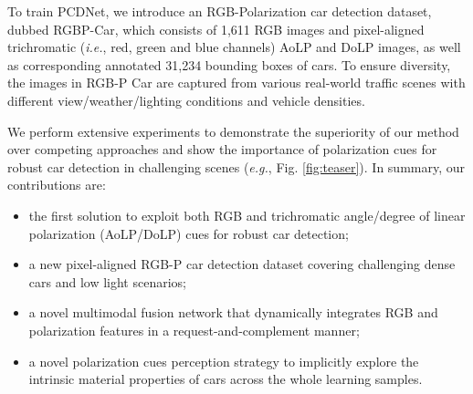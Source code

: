 To train PCDNet, we introduce an RGB-Polarization car detection dataset, dubbed RGBP-Car, which consists of 1,611 RGB images and pixel-aligned trichromatic (\textit{i.e.}, red, green and blue channels) AoLP and DoLP images, as well as corresponding annotated 31,234 bounding boxes of cars. To ensure diversity, the images in RGB-P Car are captured from various real-world traffic scenes with different view/weather/lighting conditions and vehicle densities.

We perform extensive experiments to demonstrate the superiority of our method over competing approaches and show the importance of polarization cues for robust car detection in challenging scenes (\textit{e.g.}, Fig. \ref{fig:teaser}). In summary, our contributions are:
\begin{itemize}
\item the first solution to exploit both RGB and trichromatic angle/degree of linear polarization (AoLP/DoLP) cues for robust car detection;
\item a new pixel-aligned RGB-P car detection dataset covering challenging dense cars and low light scenarios;
\item a novel multimodal fusion network that dynamically integrates RGB and polarization features in a request-and-complement manner;
\item a novel polarization cues perception strategy to implicitly explore the intrinsic material properties of cars across the whole learning samples.
\end{itemize}
